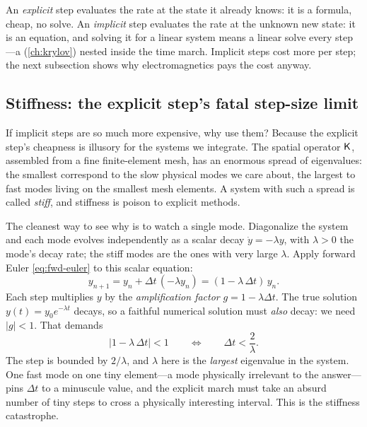 \begin{keyidea}
An \emph{explicit} step evaluates the rate at the state it already knows: it is a
formula, cheap, no solve. An \emph{implicit} step evaluates the rate at the
unknown new state: it is an equation, and solving it for a linear system means a
linear solve every step---a  (\cref{ch:krylov}) nested inside the
time march. Implicit steps cost more per step; the next subsection shows why
electromagnetics pays the cost anyway.
\end{keyidea}

\subsection{Stiffness: the explicit step's fatal step-size limit}

If implicit steps are so much more expensive, why use them? Because the explicit
step's cheapness is illusory for the systems we integrate. The spatial operator
$\mathsf{K}$, assembled from a fine finite-element mesh, has an enormous spread of
eigenvalues: the smallest correspond to the slow physical modes we care about, the
largest to fast modes living on the smallest mesh elements. A system with such a
spread is called \emph{stiff}, and stiffness is poison to explicit methods.

The cleanest way to see why is to watch a single mode. Diagonalize the system and
each mode evolves independently as a scalar decay $\dot y = -\lambda y$, with
$\lambda > 0$ the mode's decay rate; the stiff modes are the ones with very large
$\lambda$. Apply forward Euler \cref{eq:fwd-euler} to this scalar equation:
\begin{equation}
  y_{n+1} = y_n + \Delta t\,(-\lambda y_n) = (1 - \lambda\,\Delta t)\,y_n.
  \label{eq:fe-scalar}
\end{equation}
Each step multiplies $y$ by the \emph{amplification factor} $g = 1 - \lambda\Delta
t$. The true solution $y(t) = y_0 e^{-\lambda t}$ decays, so a faithful numerical
solution must \emph{also} decay: we need $|g| < 1$. That demands
\begin{equation}
  |1 - \lambda\,\Delta t| < 1
  \qquad\Longleftrightarrow\qquad
  \Delta t < \frac{2}{\lambda}.
  \label{eq:fe-stability}
\end{equation}
The step is bounded by $2/\lambda$, and $\lambda$ here is the \emph{largest}
eigenvalue in the system. One fast mode on one tiny element---a mode physically
irrelevant to the answer---pins $\Delta t$ to a minuscule value, and the explicit
march must take an absurd number of tiny steps to cross a physically interesting
interval. This is the stiffness catastrophe.

